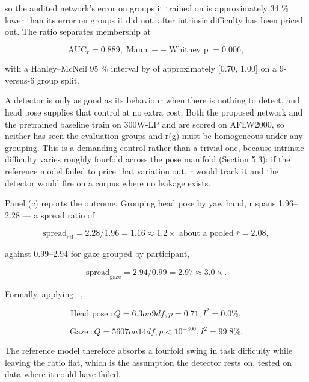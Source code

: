 so the audited network's error on groups it trained on is approximately 34 \% lower than its error on groups it did not, after intrinsic difficulty has been priced out. The ratio separates membership at

\begin{equation}
\label{eq:178}
\mathrm{AUC}_r = 0.889 , \;\text{Mann}\;--\;\text{Whitney p}\; = 0.006 ,
\end{equation}

with a Hanley--McNeil 95 \% interval by  of approximately [0.70, 1.00] on a 9-versus-6 group split.

A detector is only as good as its behaviour when there is nothing to detect, and head pose supplies that control at no extra cost. Both the proposed network and the pretrained baseline train on 300W-LP and are scored on AFLW2000, so neither has seen the evaluation groups and r(g) must be homogeneous under any grouping. This is a demanding control rather than a trivial one, because intrinsic difficulty varies roughly fourfold across the pose manifold (Section 5.3): if the reference model failed to price that variation out, r would track it and the detector would fire on a corpus where no leakage exists.

Panel (c) reports the outcome. Grouping head pose by yaw band, r spans 1.96--2.28 --- a spread ratio of

\begin{equation}
\label{eq:179}
\mathrm{spread}_{\mathrm{ctl}} = 2.28/1.96 = 1.16 \approx 1.2\times \;\text{about a pooled}\; \bar{r} = 2.08 ,
\end{equation}

against 0.99--2.94 for gaze grouped by participant,

\begin{equation}
\label{eq:180}
\mathrm{spread}_{\mathrm{gaze}} = 2.94/0.99 = 2.97 \approx 3.0\times .
\end{equation}

Formally, applying --,

\begin{equation}
\label{eq:181}
\text{Head pose}\;: Q = 6.3 on 9 df, p = 0.71, I^{2} = 0.0 \% ,
\end{equation}

\begin{equation}
\label{eq:182}
\text{Gaze}\;: Q = 5607 on 14 df, p < 10^{-300}, I^{2} = 99.8 \% .
\end{equation}

The reference model therefore absorbs a fourfold swing in task difficulty while leaving the ratio flat, which is the assumption the detector rests on, tested on data where it could have failed.

